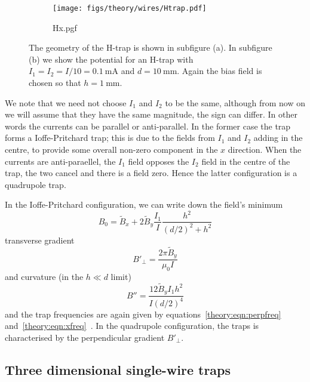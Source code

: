 \begin{figure}[htb]
  \centering
  \begin{subfigure}[b]{0.4\textwidth}
    \texttt{[image: figs/theory/wires/Htrap.pdf]}
  \end{subfigure}
  \begin{subfigure}[b]{0.4\textwidth}
    {Hx.pgf}
  \end{subfigure}
  \caption{The geometry of the H-trap is shown in subfigure (a). In subfigure
  (b) we show the potential for an H-trap with
  $I_1=I_2=I/10=\SI{0.1}{\milli\ampere}$ and $d=\SI{10}{\milli\meter}$. Again the bias field is chosen so
  that $h=\SI{1}{\milli\meter}$.}
  \label{theory:fig:Htrap}
\end{figure}

We note that we need not choose $I_1$ and $I_2$ to be the same, although from
now on we will assume that they have the same magnitude, the sign can differ.
In other words the currents can be parallel or anti-parallel. In the former
case the trap forms a Ioffe-Pritchard trap; this is due to the fields from
$I_1$ and $I_2$ adding in the centre, to provide some overall non-zero
component in the $x$ direction. When the currents are anti-paraellel, the $I_1$
field opposes the $I_2$ field in the centre of the trap, the two cancel and
there is a field zero. Hence the latter configuration is a quadrupole trap.

In the Ioffe-Pritchard configuration, we can write down the field's
minimum
%
\begin{equation}
  B_0 = \tilde{B}_x + 2\tilde{B}_y \frac{I_1}{I}\frac{h^2}{(d/2)^2 + h^2}
\end{equation}
%
transverse gradient
%
\begin{equation}
  B'_\perp = \frac{2\pi\tilde{B}_y}{\mu_0 I}
\end{equation}
%
and curvature (in the $h \ll d$ limit)~\cite{PhysRevA.79.013407}
%
\begin{equation}
  B'' = \frac{12\tilde{B}_y I_1 h^2}{I (d/2)^4}
\end{equation}
%
and the trap frequencies are again given by equations~\ref{theory:eqn:perpfreq}
and~\ref{theory:eqn:xfreq}~\cite{PhysRevA.79.013407}. In the quadrupole
configuration, the traps is characterised by the perpendicular gradient
$B'_\perp$. 

\subsection{Three dimensional single-wire traps}

